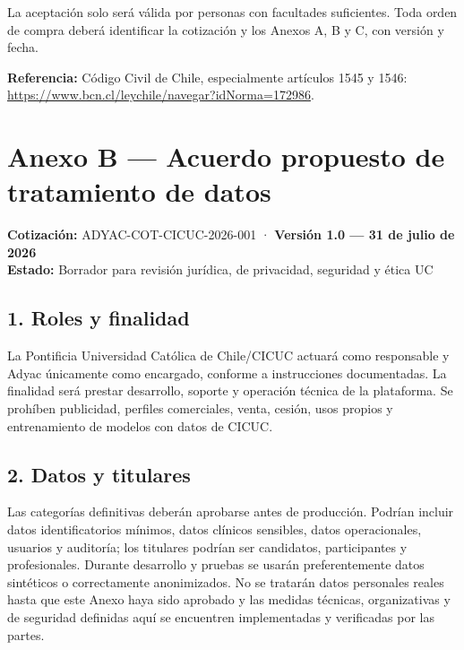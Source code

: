\documentclass[
]{article}
\begin{document}
La aceptación solo será válida por personas con facultades suficientes.
Toda orden de compra deberá identificar la cotización y los Anexos A, B
y C, con versión y fecha.

\textbf{Referencia:} Código Civil de Chile, especialmente artículos 1545
y 1546: \url{https://www.bcn.cl/leychile/navegar?idNorma=172986}.

\hypertarget{anexo-b--acuerdo-propuesto-de-tratamiento-de-datos}{%
\section{Anexo B --- Acuerdo propuesto de tratamiento de
datos}\label{anexo-b--acuerdo-propuesto-de-tratamiento-de-datos}}

\textbf{Cotización:} ADYAC-COT-CICUC-2026-001 · \textbf{Versión 1.0 ---
31 de julio de 2026}\\
\textbf{Estado:} Borrador para revisión jurídica, de privacidad,
seguridad y ética UC

\hypertarget{1-roles-y-finalidad}{%
\subsection{1. Roles y finalidad}\label{1-roles-y-finalidad}}

La Pontificia Universidad Católica de Chile/CICUC actuará como
responsable y Adyac únicamente como encargado, conforme a instrucciones
documentadas. La finalidad será prestar desarrollo, soporte y operación
técnica de la plataforma. Se prohíben publicidad, perfiles comerciales,
venta, cesión, usos propios y entrenamiento de modelos con datos de
CICUC.

\hypertarget{2-datos-y-titulares}{%
\subsection{2. Datos y titulares}\label{2-datos-y-titulares}}

Las categorías definitivas deberán aprobarse antes de producción.
Podrían incluir datos identificatorios mínimos, datos clínicos
sensibles, datos operacionales, usuarios y auditoría; los titulares
podrían ser candidatos, participantes y profesionales. Durante
desarrollo y pruebas se usarán preferentemente datos sintéticos o
correctamente anonimizados. No se tratarán datos personales reales hasta
que este Anexo haya sido aprobado y las medidas técnicas, organizativas
y de seguridad definidas aquí se encuentren implementadas y verificadas
por las partes.
\end{document}
